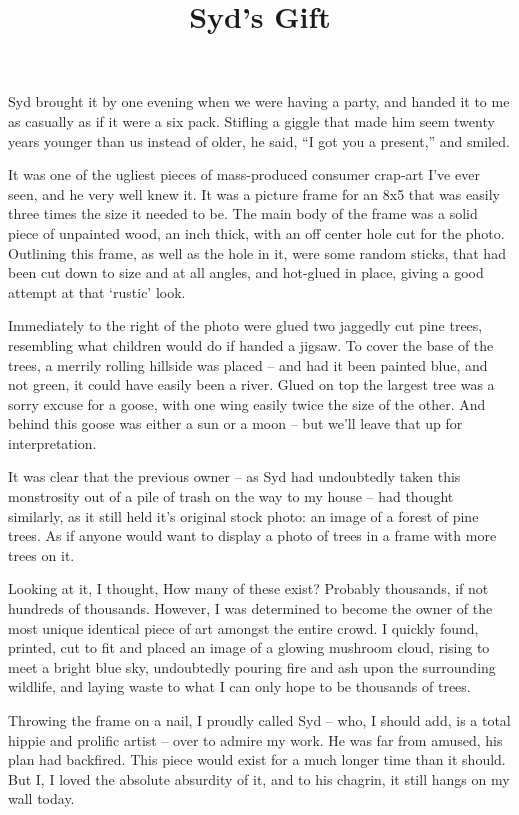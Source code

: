 \documentclass[letterpaper]{article}
\title{Syd's Gift}
\date{}
\begin{document}
	\maketitle
	\thispagestyle{empty}
	\onehalfspacing
Syd brought it by one evening when we were having a party, and handed it to me as casually as if it were a six pack. Stifling a giggle that made him seem twenty years younger than us instead of older, he said, ``I got you a present,'' and smiled.

It was one of the ugliest pieces of mass-produced consumer crap-art I've ever seen, and he very well knew it. It was a picture frame for an 8x5 that was easily three times the size it needed to be. The main body of the frame was a solid piece of unpainted wood, an inch thick, with an off center hole cut for the photo. Outlining this frame, as well as the hole in it, were some random sticks, that had been cut down to size and at all angles, and hot-glued in place, giving a good attempt at that `rustic' look.

Immediately to the right of the photo were glued two jaggedly cut pine trees, resembling what children would do if handed a jigsaw. To cover the base of the trees, a merrily rolling hillside was placed -- and had it been painted blue, and not green, it could have easily been a river. Glued on top the largest tree was a sorry excuse for a goose, with one wing easily twice the size of the other. And behind this goose was either a sun or a moon -- but we'll leave that up for interpretation.

It was clear that the previous owner -- as Syd had undoubtedly taken this monstrosity out of a pile of trash on the way to my house -- had thought similarly, as it still held it's original stock photo: an image of a forest of pine trees. As if anyone would want to display a photo of trees in a frame with more trees on it.

Looking at it, I thought, How many of these exist? Probably thousands, if not hundreds of thousands. However, I was determined to become the owner of the most unique identical piece of art amongst the entire crowd. I quickly found, printed, cut to fit and placed an image of a glowing mushroom cloud, rising to meet a bright blue sky, undoubtedly pouring fire and ash upon the surrounding wildlife, and laying waste to what I can only hope to be thousands of trees.

Throwing the frame on a nail, I proudly called Syd -- who, I should add, is a total hippie and prolific artist -- over to admire my work. He was far from amused, his plan had backfired. This piece would exist for a much longer time than it should. But I, I loved the absolute absurdity of it, and to his chagrin, it still hangs on my wall today.
\end{document}
